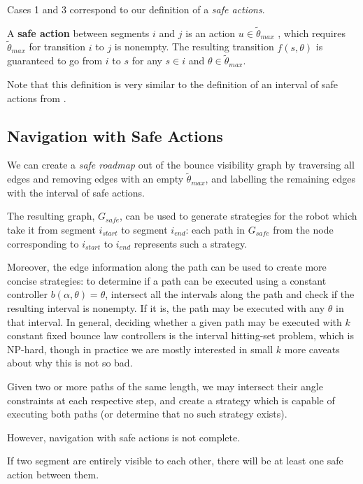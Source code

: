 \documentclass[]{svproc}  %
\begin{document}
Cases 1 and 3 correspond to our definition of a \emph{safe actions}.

\begin{definition}
A \textbf{safe action} between segments $i$ and $j$ is an action $u \in \tilde{\theta}_{max}$
, which requires $\tilde{\theta}_{max}$ for transition $i$ to $j$ is nonempty.
The resulting transition $f(s, \theta)$ is guaranteed to
go from $i$ to $s$ for any $s \in i$ and $\theta \in \tilde{\theta}_{max}$.
\end{definition}

Note that this definition is very similar to the definition of an interval of
safe actions from \cite{LewOKa13}.

\subsection{Navigation with Safe Actions} \label{sec:safe}

We can create a \emph{safe roadmap} out of the bounce visibility graph by
traversing all edges and removing edges with an empty $\tilde{\theta}_{max}$,
and labelling the remaining edges with the interval of safe actions.

The resulting graph, $G_{safe}$, can be used to generate strategies for the
robot which take it from segment $i_{start}$ to segment $i_{end}$: each path in
$G_{safe}$ from the node corresponding to $i_{start}$ to $i_{end}$ represents
such a strategy.

Moreover, the edge
information along the path can be used to create more concise strategies: to
determine if a path can be executed using a constant controller $b(\alpha,
\theta) = \theta$, intersect all the intervals along the path and check if the
resulting interval is nonempty. If it is, the path may be executed with any
$\theta$ in that interval. In general, deciding whether a given path may be
executed with $k$ constant fixed bounce law controllers is the interval
hitting-set problem, which is NP-hard, though in practice we are mostly
interested in small $k$ {\color{red} more caveats about why this is not so bad}.

Given two or more paths of the same length, we may intersect their angle
constraints at each respective step, and create a strategy which is capable of
executing both paths (or determine that no such strategy exists).

However, navigation with safe actions is not complete.

If two segment are entirely visible to each other, there will be at least one safe
action between them.
\end{document}

